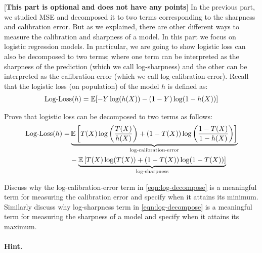 \item[(c)]  [{\bf{This part is optional and does not have any points}}]
In the previous part, we studied MSE and decomposed it to two terms corresponding to the sharpness and calibration error.
But as we explained, there are other different ways to measure the calibration and sharpness of a model.
In this part we focus on logistic regression models.
In particular, we are going to show logistic loss can also be decomposed to two terms; where one term can be interpreted as the sharpness of the prediction (which we call log-sharpness) and the other can be interpreted as the calibration error (which we call log-calibration-error).  
Recall that the logistic loss (on population) of the model $h$ is defined as:
\begin{align}
\text {Log-Loss}(h) = \mathbb{E} [-Y \log (h(X)) - (1-Y) \log (1-h(X))]
\end{align}

Prove that logistic loss can be decomposed to two terms as follows:
\begin{align}
\text {Log-Loss}(h) =&\underbrace{\mathbb{E} \left [T(X) \log \left(\frac{T(X)}{h(X)}\right) + (1-T(X)) \log \left(\frac{1-T(X)}{1-h(X)}\right)\right ]}_\text {log-calibration-error} \nonumber \\
&-\underbrace{\mathbb{E} \left [T(X) \log (T(X)) + (1-T(X)) \log (1-T(X)) \right]}_\text {log-sharpness}\label{eqn:log-decompose}
\end{align}

Discuss why the log-calibration-error term in \eqref{eqn:log-decompose} is a meaningful term for measuring the calibration error and specify when it attains its minimum.
Similarly discuss why log-sharpness term in \eqref{eqn:log-decompose}  is a meaningful term for measuring the sharpness of a model and specify when it attains its maximum.

\paragraph{Hint.} 

